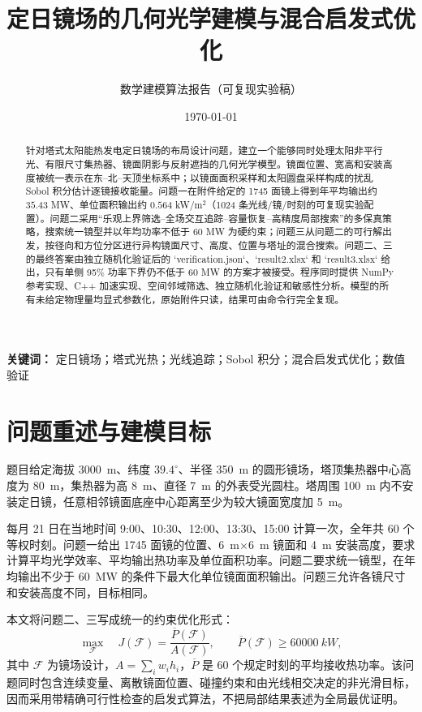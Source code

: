 \documentclass[UTF8,a4paper,11pt]{ctexart}
\title{定日镜场的几何光学建模与混合启发式优化}
\author{数学建模算法报告（可复现实验稿）}
\date{\today}
\begin{document}
\maketitle
\begin{abstract}
针对塔式太阳能热发电定日镜场的布局设计问题，建立一个能够同时处理太阳非平行光、有限尺寸集热器、镜面阴影与反射遮挡的几何光学模型。镜面位置、宽高和安装高度被统一表示在东--北--天顶坐标系中；以镜面面积采样和太阳圆盘采样构成的扰乱 Sobol 积分估计逐镜接收能量。问题一在附件给定的 1745 面镜上得到年平均输出约 $35.43$ MW、单位面积输出约 $0.564$ kW/m$^2$（1024 条光线/镜/时刻的可复现实验配置）。问题二采用“乐观上界筛选--全场交互追踪--容量恢复--高精度局部搜索”的多保真策略，搜索统一镜型并以年均功率不低于 60 MW 为硬约束；问题三从问题二的可行解出发，按径向和方位分区进行异构镜面尺寸、高度、位置与塔址的混合搜索。问题二、三的最终答案由独立随机化验证后的 `verification.json`、`result2.xlsx` 和 `result3.xlsx` 给出，只有单侧 95\% 功率下界仍不低于 60 MW 的方案才被接受。程序同时提供 NumPy 参考实现、C++ 加速实现、空间邻域筛选、独立随机化验证和敏感性分析。模型的所有未给定物理量均显式参数化，原始附件只读，结果可由命令行完全复现。
\end{abstract}

\noindent\textbf{关键词：} 定日镜场；塔式光热；光线追踪；Sobol 积分；混合启发式优化；数值验证

\section{问题重述与建模目标}
题目给定海拔 \SI{3000}{m}、纬度 $39.4^\circ$、半径 \SI{350}{m} 的圆形镜场，塔顶集热器中心高度为 \SI{80}{m}，集热器为高 \SI{8}{m}、直径 \SI{7}{m} 的外表受光圆柱。塔周围 \SI{100}{m} 内不安装定日镜，任意相邻镜面底座中心距离至少为较大镜面宽度加 \SI{5}{m}。\par

每月 21 日在当地时间 9:00、10:30、12:00、13:30、15:00 计算一次，全年共 60 个等权时刻。问题一给出 1745 面镜的位置、\SI{6}{m}$\times$\SI{6}{m} 镜面和 \SI{4}{m} 安装高度，要求计算平均光学效率、平均输出热功率及单位面积功率。问题二要求统一镜型，在年均输出不少于 \SI{60}{MW} 的条件下最大化单位镜面面积输出。问题三允许各镜尺寸和安装高度不同，目标相同。

本文将问题二、三写成统一的约束优化形式：
\begin{equation}
 \max_{\mathcal F}\quad J(\mathcal F)=\frac{\overline P(\mathcal F)}{A(\mathcal F)},
 \qquad \overline P(\mathcal F)\ge 60000\ \si{kW},
 \label{eq:objective}
\end{equation}
其中 $\mathcal F$ 为镜场设计，$A=\sum_i w_i h_i$，$\overline P$ 是 60 个规定时刻的平均接收热功率。该问题同时包含连续变量、离散镜面位置、碰撞约束和由光线相交决定的非光滑目标，因而采用带精确可行性检查的启发式算法，不把局部结果表述为全局最优证明。
\end{document}

